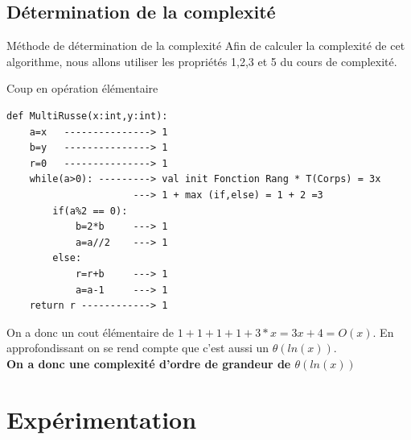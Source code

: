 \documentclass[12pt,a4paper]{report}
\begin{document}
\subsection{Détermination de la complexité}
\begin{mybox}{Méthode de détermination de la complexité}
Afin de calculer la complexité de cet algorithme, nous allons utiliser les propriétés 1,2,3 et 5 du cours de complexité.
\end{mybox}
\begin{Cas3}{Coup en opération élémentaire}
 \begin{lstlisting}
def MultiRusse(x:int,y:int):
    a=x   ---------------> 1
    b=y   ---------------> 1
    r=0   ---------------> 1
    while(a>0): ---------> val init Fonction Rang * T(Corps) = 3x
    	              ---> 1 + max (if,else) = 1 + 2 =3
    	if(a%2 == 0): 
            b=2*b     ---> 1
            a=a//2    ---> 1
        else:
            r=r+b     ---> 1
            a=a-1     ---> 1
    return r ------------> 1
\end{lstlisting}
\end{Cas3}
\begin{flushleft}
On a donc un cout élémentaire de $1+1+1+1+3*x=3x+4=O(x)$. En approfondissant on se rend compte que c'est aussi un $\theta(ln(x))$.\\
\textbf{On a donc une complexité d'ordre de grandeur de $\theta(ln(x))$}
\end{flushleft}
\section*{Expérimentation}
\end{document}
